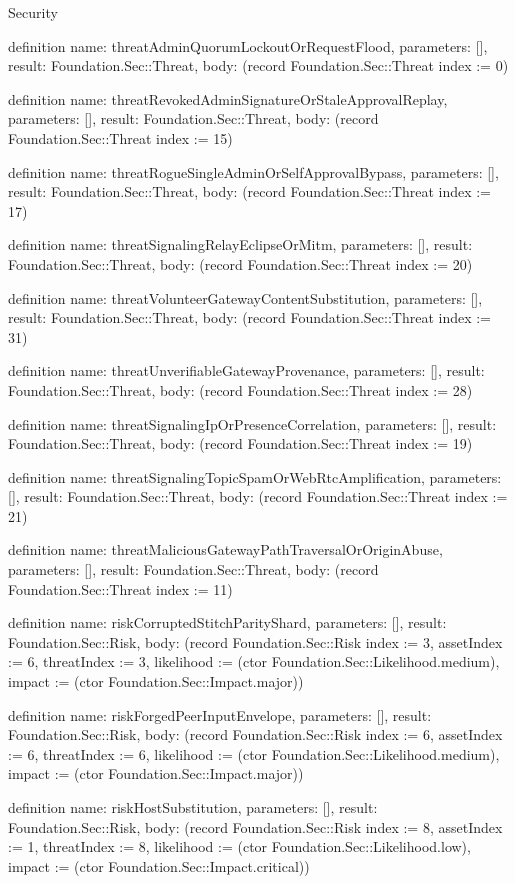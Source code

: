 \begin{lexlean}{Security}
\begin{semanticmodule}
definition{
  name: threatAdminQuorumLockoutOrRequestFlood,
  parameters: [],
  result: Foundation.Sec::Threat,
  body: (record Foundation.Sec::Threat {index := 0})
}

definition{
  name: threatRevokedAdminSignatureOrStaleApprovalReplay,
  parameters: [],
  result: Foundation.Sec::Threat,
  body: (record Foundation.Sec::Threat {index := 15})
}

definition{
  name: threatRogueSingleAdminOrSelfApprovalBypass,
  parameters: [],
  result: Foundation.Sec::Threat,
  body: (record Foundation.Sec::Threat {index := 17})
}

definition{
  name: threatSignalingRelayEclipseOrMitm,
  parameters: [],
  result: Foundation.Sec::Threat,
  body: (record Foundation.Sec::Threat {index := 20})
}

definition{
  name: threatVolunteerGatewayContentSubstitution,
  parameters: [],
  result: Foundation.Sec::Threat,
  body: (record Foundation.Sec::Threat {index := 31})
}

definition{
  name: threatUnverifiableGatewayProvenance,
  parameters: [],
  result: Foundation.Sec::Threat,
  body: (record Foundation.Sec::Threat {index := 28})
}

definition{
  name: threatSignalingIpOrPresenceCorrelation,
  parameters: [],
  result: Foundation.Sec::Threat,
  body: (record Foundation.Sec::Threat {index := 19})
}

definition{
  name: threatSignalingTopicSpamOrWebRtcAmplification,
  parameters: [],
  result: Foundation.Sec::Threat,
  body: (record Foundation.Sec::Threat {index := 21})
}

definition{
  name: threatMaliciousGatewayPathTraversalOrOriginAbuse,
  parameters: [],
  result: Foundation.Sec::Threat,
  body: (record Foundation.Sec::Threat {index := 11})
}

definition{
  name: riskCorruptedStitchParityShard,
  parameters: [],
  result: Foundation.Sec::Risk,
  body: (record Foundation.Sec::Risk {index := 3, assetIndex := 6, threatIndex := 3, likelihood := (ctor Foundation.Sec::Likelihood.medium), impact := (ctor Foundation.Sec::Impact.major)})
}

definition{
  name: riskForgedPeerInputEnvelope,
  parameters: [],
  result: Foundation.Sec::Risk,
  body: (record Foundation.Sec::Risk {index := 6, assetIndex := 6, threatIndex := 6, likelihood := (ctor Foundation.Sec::Likelihood.medium), impact := (ctor Foundation.Sec::Impact.major)})
}

definition{
  name: riskHostSubstitution,
  parameters: [],
  result: Foundation.Sec::Risk,
  body: (record Foundation.Sec::Risk {index := 8, assetIndex := 1, threatIndex := 8, likelihood := (ctor Foundation.Sec::Likelihood.low), impact := (ctor Foundation.Sec::Impact.critical)})
}


\end{semanticmodule}
\end{lexlean}
